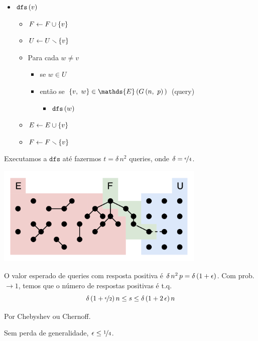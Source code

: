 \begin{itemize}[label={}]
  \item $\texttt{dfs}\left(v\vphantom{1j}\right)$
  \begin{itemize}[label={}]
    \item $F\leftarrow F\cup\left\{v\vphantom{1j}\right\}$
    \item $U\leftarrow U\setminus\left\{v\vphantom{1j}\right\}$
    \item Para cada $w\neq v$
    \begin{itemize}[label={}]
      \item se $w\in U$
      \item então se $\left\{v,\ w\vphantom{1j}\right\}\in\mathds{E}\left(G\left(n,\ p\vphantom{1j}\right)\vphantom{1j}\right)$ (query)
      \begin{itemize}[label={}]
        \item $\texttt{dfs}\left(w\vphantom{1j}\right)$
      \end{itemize}
    \end{itemize}
    \item $E\leftarrow E\cup\left\{v\vphantom{1j}\right\}$
    \item $F\leftarrow F\setminus\left\{v\vphantom{1j}\right\}$
  \end{itemize}
\end{itemize}

Executamos a $\texttt{dfs}$ até fazermos $t=\delta\,n^2$ queries, onde $\delta=\nicefrac{\epsilon}{4}$.

\includegraphics[width=0.75\textwidth]{aulas/10_17/dfs.png}

\begin{observacao}
  O valor esperado de queries com resposta positiva é $\delta\,n^2\,p=\delta\left(1+\epsilon\vphantom{1j}\right)$. Com prob. $\rightarrow1$, temos que o número de respostas positivas é t.q.
  \[
    \delta\left(1+\nicefrac{\epsilon}{2}\vphantom{1j}\right)n \leq s \leq \delta\left(1+2\,\epsilon\vphantom{1j}\right)n
  \]
  
  Por Chebyshev ou Chernoff.
  
  Sem perda de generalidade, $\epsilon\leq\nicefrac{1}{4}$.
\end{observacao}

